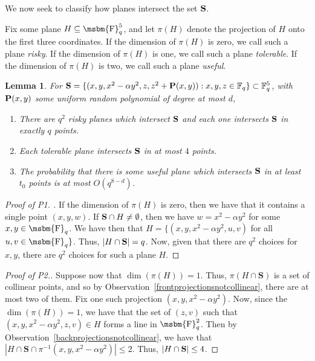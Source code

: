\documentclass[12pt]{article}
\newtheorem{lemma}[theorem]{Lemma}
\newcommand{\FF}{\mbox{\msbm{F}}}
\begin{document}
We now seek to classify how planes intersect the set $\bold{S}$.

Fix some plane $H \subseteq \FF_q^5$, and let $\pi(H)$ denote the projection of $H$ onto the first three coordinates. If the dimension of $\pi(H)$ is zero, we call such a plane \textit{risky}. If the dimension of $\pi(H)$ is one, we call such a plane \textit{tolerable}. If the dimension of $\pi(H)$ is two, we call such a plane \textit{useful}. 

\begin{lemma}\label{lemma-characterization}
For $\bold{S} = \{(x, y, x^2 - \alpha y^2, z, z^2 + \bold{P}(x, y)): x,y,z\in \mathbb{F}_q\}\subset \mathbb{F}_q^5$, with $\bold{P}(x, y)$ some uniform random polynomial of degree at most $d$, 
\begin{enumerate}
    \item[P1.] There are $q^2$ risky planes which intersect $\bold{S}$ and each one intersects $\bold{S}$ in exactly $q$ points. 
    \item[P2.] Each tolerable plane intersects $\bold{S}$ in at most $4$ points. 
    \item[P3.] The probability that there is some useful plane which intersects $\bold{S}$ in at least $t_0$ points is at most $O(q^{8 - d})$. 
\end{enumerate}
    
\end{lemma} 
    

\begin{proof}[Proof of P1. ]
    If the dimension of $\pi(H)$ is zero, then we have that it contains a single point $(x, y, w)$. If $\bold{S} \cap H \neq \emptyset$, then we have $w =  x^2 - \alpha y^2$ for some $x, y \in \FF_q$. We have then that $H = \{(x, y, x^2 - \alpha y^2, u, v)$ for all $u, v \in \FF_q\}$. Thus, $|H \cap \bold{S}| = q$. Now, given that there are $q^2$ choices for $x, y$, there are $q^2$ choices for such a plane $H$.
\end{proof}

\begin{proof}[Proof of P2.]
     Suppose now that $\dim(\pi(H)) = 1$. Thus, $\pi(H \cap \textbf{S})$ is a set of collinear points, and so by Observation~\ref{frontprojectionsnotcollinear}, there are at most two of them. Fix one such projection $(x, y, x^2 - \alpha y^2)$. Now, since the $\dim(\pi(H)) = 1$, we have that the set of $(z, v)$ such that $(x, y, x^2 - \alpha y^2, z, v) \in H$ forms a line in $\FF_q^2$. Then by Observation~\ref{backprojectionsnotcollinear}, we have that $|H\cap \textbf{S} \cap \pi^{-1}(x, y, x^2 - \alpha y^2)| \leq 2$. Thus, $|H \cap \bold{S}| \leq 4$.  
\end{proof}
\end{document}
